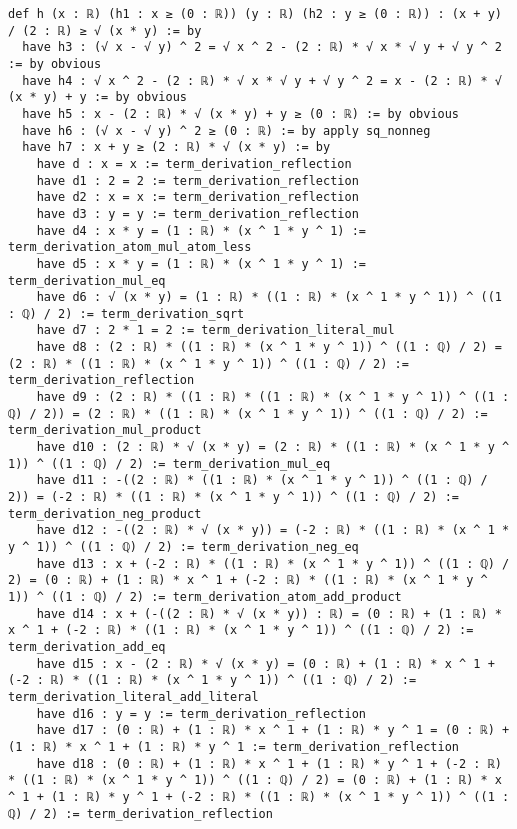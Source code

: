 \documentclass{article}
\begin{document}
\begin{tcolorbox}[colback=white!10, width=\linewidth]
\begin{lstlisting}[language=Lean4]
def h (x : ℝ) (h1 : x ≥ (0 : ℝ)) (y : ℝ) (h2 : y ≥ (0 : ℝ)) : (x + y) / (2 : ℝ) ≥ √ (x * y) := by
  have h3 : (√ x - √ y) ^ 2 = √ x ^ 2 - (2 : ℝ) * √ x * √ y + √ y ^ 2 := by obvious
  have h4 : √ x ^ 2 - (2 : ℝ) * √ x * √ y + √ y ^ 2 = x - (2 : ℝ) * √ (x * y) + y := by obvious
  have h5 : x - (2 : ℝ) * √ (x * y) + y ≥ (0 : ℝ) := by obvious
  have h6 : (√ x - √ y) ^ 2 ≥ (0 : ℝ) := by apply sq_nonneg
  have h7 : x + y ≥ (2 : ℝ) * √ (x * y) := by
    have d : x = x := term_derivation_reflection
    have d1 : 2 = 2 := term_derivation_reflection
    have d2 : x = x := term_derivation_reflection
    have d3 : y = y := term_derivation_reflection
    have d4 : x * y = (1 : ℝ) * (x ^ 1 * y ^ 1) := term_derivation_atom_mul_atom_less
    have d5 : x * y = (1 : ℝ) * (x ^ 1 * y ^ 1) := term_derivation_mul_eq
    have d6 : √ (x * y) = (1 : ℝ) * ((1 : ℝ) * (x ^ 1 * y ^ 1)) ^ ((1 : ℚ) / 2) := term_derivation_sqrt
    have d7 : 2 * 1 = 2 := term_derivation_literal_mul
    have d8 : (2 : ℝ) * ((1 : ℝ) * (x ^ 1 * y ^ 1)) ^ ((1 : ℚ) / 2) = (2 : ℝ) * ((1 : ℝ) * (x ^ 1 * y ^ 1)) ^ ((1 : ℚ) / 2) := term_derivation_reflection
    have d9 : (2 : ℝ) * ((1 : ℝ) * ((1 : ℝ) * (x ^ 1 * y ^ 1)) ^ ((1 : ℚ) / 2)) = (2 : ℝ) * ((1 : ℝ) * (x ^ 1 * y ^ 1)) ^ ((1 : ℚ) / 2) := term_derivation_mul_product
    have d10 : (2 : ℝ) * √ (x * y) = (2 : ℝ) * ((1 : ℝ) * (x ^ 1 * y ^ 1)) ^ ((1 : ℚ) / 2) := term_derivation_mul_eq
    have d11 : -((2 : ℝ) * ((1 : ℝ) * (x ^ 1 * y ^ 1)) ^ ((1 : ℚ) / 2)) = (-2 : ℝ) * ((1 : ℝ) * (x ^ 1 * y ^ 1)) ^ ((1 : ℚ) / 2) := term_derivation_neg_product
    have d12 : -((2 : ℝ) * √ (x * y)) = (-2 : ℝ) * ((1 : ℝ) * (x ^ 1 * y ^ 1)) ^ ((1 : ℚ) / 2) := term_derivation_neg_eq
    have d13 : x + (-2 : ℝ) * ((1 : ℝ) * (x ^ 1 * y ^ 1)) ^ ((1 : ℚ) / 2) = (0 : ℝ) + (1 : ℝ) * x ^ 1 + (-2 : ℝ) * ((1 : ℝ) * (x ^ 1 * y ^ 1)) ^ ((1 : ℚ) / 2) := term_derivation_atom_add_product
    have d14 : x + (-((2 : ℝ) * √ (x * y)) : ℝ) = (0 : ℝ) + (1 : ℝ) * x ^ 1 + (-2 : ℝ) * ((1 : ℝ) * (x ^ 1 * y ^ 1)) ^ ((1 : ℚ) / 2) := term_derivation_add_eq
    have d15 : x - (2 : ℝ) * √ (x * y) = (0 : ℝ) + (1 : ℝ) * x ^ 1 + (-2 : ℝ) * ((1 : ℝ) * (x ^ 1 * y ^ 1)) ^ ((1 : ℚ) / 2) := term_derivation_literal_add_literal
    have d16 : y = y := term_derivation_reflection
    have d17 : (0 : ℝ) + (1 : ℝ) * x ^ 1 + (1 : ℝ) * y ^ 1 = (0 : ℝ) + (1 : ℝ) * x ^ 1 + (1 : ℝ) * y ^ 1 := term_derivation_reflection
    have d18 : (0 : ℝ) + (1 : ℝ) * x ^ 1 + (1 : ℝ) * y ^ 1 + (-2 : ℝ) * ((1 : ℝ) * (x ^ 1 * y ^ 1)) ^ ((1 : ℚ) / 2) = (0 : ℝ) + (1 : ℝ) * x ^ 1 + (1 : ℝ) * y ^ 1 + (-2 : ℝ) * ((1 : ℝ) * (x ^ 1 * y ^ 1)) ^ ((1 : ℚ) / 2) := term_derivation_reflection

\end{lstlisting}
\end{tcolorbox}
\end{document}
